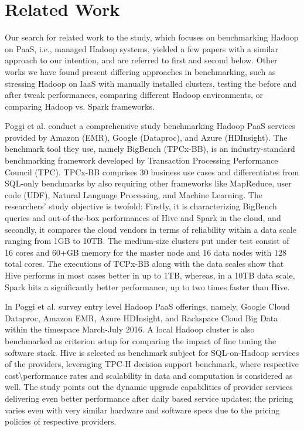 \documentclass[review]{elsarticle}
\begin{document}
\section{Related Work}
Our search for related work to the study, which focuses on benchmarking Hadoop on PaaS, i.e., managed Hadoop systems, yielded a few papers with a similar approach to our intention, and are referred to first and second below. Other works we have found present differing approaches in benchmarking, such as stressing Hadoop on IaaS with manually installed clusters, testing the before and after tweak performances, comparing different Hadoop environments, or comparing Hadoop vs. Spark frameworks.

Poggi et al. \cite{poggi_characterizing_2018} conduct a comprehensive study benchmarking Hadoop PaaS services provided by Amazon (EMR), Google (Dataproc), and Azure (HDInsight). The benchmark tool they use, namely BigBench (TPCx-BB), is an industry-standard benchmarking framework developed by Transaction Processing Performance Council (TPC). TPCx-BB comprises 30 business use cases and differentiates from SQL-only benchmarks by also requiring other frameworks like MapReduce, user code (UDF), Natural Language Processing, and Machine Learning. The researchers' study objective is twofold: Firstly, it is characterizing BigBench queries and out-of-the-box performances of Hive and Spark in the cloud, and secondly, it compares the cloud vendors in terms of reliability within a data scale ranging from 1GB to 10TB. The medium-size clusters put under test consist of 16 cores and 60+GB memory for the master node and 16 data nodes with 128 total cores. The executions of TCPx-BB along with the data scales show that Hive performs in most cases better in up to 1TB, whereas, in a 10TB data scale, Spark hits a significantly better performance, up to two times faster than Hive.

In \cite{poggi_state_2016} Poggi et al. survey entry level Hadoop PaaS offerings, namely, Google Cloud Dataproc, Amazon EMR, Azure HDInsight, and Rackspace Cloud Big Data within the timespace March-July 2016. A local Hadoop cluster is also benchmarked as criterion setup for comparing the impact of fine tuning the software stack. Hive is selected as benchmark subject for SQL-on-Hadoop services of the providers, leveraging TPC-H decision support benchmark, where respective cost\textbackslash{}performance rates and scalability in data and computation is considered as well. The study points out the dynamic upgrade capabilities of provider services delivering even better performance after daily based service updates; the pricing varies even with very similar hardware and software specs due to the pricing policies of respective providers.
\end{document}
